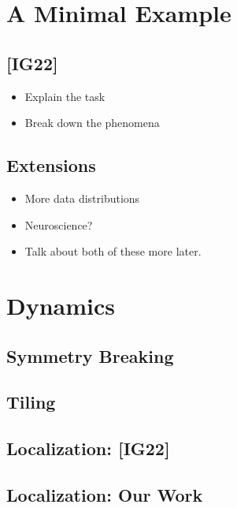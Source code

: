 \documentclass[usletter,twoside,12pt]{book}
\begin{document}
\chapter{A Minimal Example}

\section{[IG22]}

\begin{itemize}
   \item Explain the task
   \item Break down the phenomena 
\end{itemize}

\section{Extensions}

\begin{itemize}
   \item More data distributions
   \item Neuroscience? 
   \item Talk about both of these more later.
\end{itemize}


\chapter{Dynamics}

\section{Symmetry Breaking}

\section{Tiling}

\section{Localization: [IG22]}

\section{Localization: Our Work}
\end{document}
